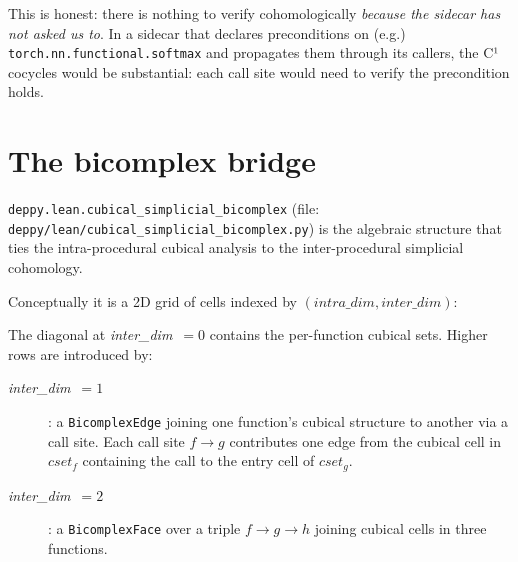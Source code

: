 This is honest: there is nothing to verify cohomologically
\emph{because the sidecar has not asked us to}.  In a sidecar that
declares preconditions on (e.g.)
\texttt{torch.nn.functional.softmax} and propagates them through
its callers, the C¹ cocycles would be substantial: each call site
would need to verify the precondition holds.

\section{The bicomplex bridge}
\label{sec:bicomplex}

\texttt{deppy.lean.cubical\_simplicial\_bicomplex} (file:
\texttt{deppy/lean/cubical\_simplicial\_bicomplex.py}) is the
algebraic structure that ties the intra-procedural cubical analysis
to the inter-procedural simplicial cohomology.

Conceptually it is a 2D grid of cells indexed by
$(\textit{intra\_dim}, \textit{inter\_dim})$:

\begin{center}
\end{center}

The diagonal at \textit{inter\_dim}~$=0$ contains the per-function
cubical sets.  Higher rows are introduced by:

\begin{description}
  \item[\textit{inter\_dim}~$=1$]: a \texttt{BicomplexEdge} joining
  one function's cubical structure to another via a call site.  Each
  call site $f \to g$ contributes one edge from the cubical cell in
  $\textit{cset}_f$ containing the call to the entry cell of
  $\textit{cset}_g$.
  \item[\textit{inter\_dim}~$=2$]: a \texttt{BicomplexFace} over a
  triple $f \to g \to h$ joining cubical cells in three functions.
\end{description}

